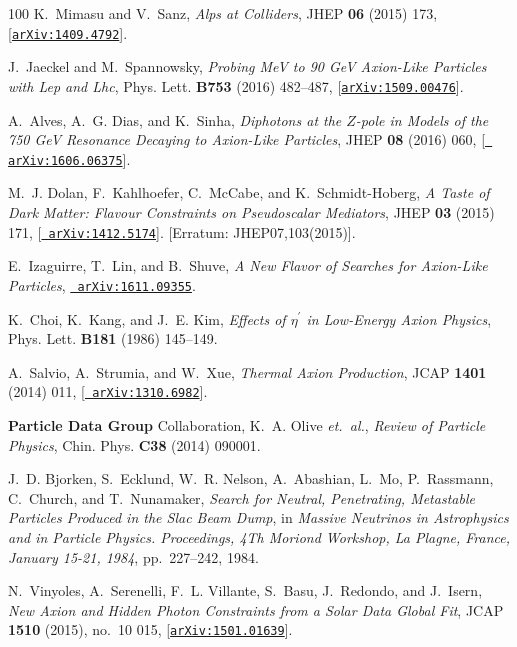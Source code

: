 \documentclass[11pt]{article}
\renewcommand{\[}{\begin{equation}}
\renewcommand{\]}{\end{equation}}
\begin{document}
\begin{thebibliography}{100}
K.~Mimasu and V.~Sanz, {\it {Alps at Colliders}},  JHEP {\bf 06} (2015) 173,
  [\href{http://xxx.lanl.gov/abs/1409.4792}{{\tt arXiv:1409.4792}}].

J.~Jaeckel and M.~Spannowsky, {\it {Probing MeV to 90 GeV Axion-Like Particles
  with Lep and Lhc}},  Phys. Lett. {\bf B753} (2016) 482--487,
  [\href{http://xxx.lanl.gov/abs/1509.00476}{{\tt arXiv:1509.00476}}].

A.~Alves, A.~G. Dias, and K.~Sinha, {\it {Diphotons at the $Z$-pole in Models
  of the 750 GeV Resonance Decaying to Axion-Like Particles}},  JHEP {\bf 08}
  (2016) 060, [\href{http://xxx.lanl.gov/abs/1606.06375}{{\tt
  arXiv:1606.06375}}].

M.~J. Dolan, F.~Kahlhoefer, C.~McCabe, and K.~Schmidt-Hoberg, {\it {A Taste of
  Dark Matter: Flavour Constraints on Pseudoscalar Mediators}},  JHEP {\bf 03}
  (2015) 171, [\href{http://xxx.lanl.gov/abs/1412.5174}{{\tt
  arXiv:1412.5174}}]. [Erratum: JHEP07,103(2015)].

E.~Izaguirre, T.~Lin, and B.~Shuve, {\it {A New Flavor of Searches for
  Axion-Like Particles}},  \href{http://xxx.lanl.gov/abs/1611.09355}{{\tt
  arXiv:1611.09355}}.

K.~Choi, K.~Kang, and J.~E. Kim, {\it {Effects of $\eta^\prime$ in Low-Energy
  Axion Physics}},  Phys. Lett. {\bf B181} (1986) 145--149.

A.~Salvio, A.~Strumia, and W.~Xue, {\it {Thermal Axion Production}},  JCAP {\bf
  1401} (2014) 011, [\href{http://xxx.lanl.gov/abs/1310.6982}{{\tt
  arXiv:1310.6982}}].

{\bf Particle Data Group} Collaboration, K.~A. Olive {\em et.~al.}, {\it
  {Review of Particle Physics}},  Chin. Phys. {\bf C38} (2014) 090001.

J.~D. Bjorken, S.~Ecklund, W.~R. Nelson, A.~Abashian, L.~Mo, P.~Rassmann,
  C.~Church, and T.~Nunamaker, {\it {Search for Neutral, Penetrating,
  Metastable Particles Produced in the Slac Beam Dump}},  in {\em {Massive
  Neutrinos in Astrophysics and in Particle Physics. Proceedings, 4Th Moriond
  Workshop, La Plagne, France, January 15-21, 1984}}, pp.~227--242, 1984.

N.~Vinyoles, A.~Serenelli, F.~L. Villante, S.~Basu, J.~Redondo, and J.~Isern,
  {\it {New Axion and Hidden Photon Constraints from a Solar Data Global Fit}},
   JCAP {\bf 1510} (2015), no.~10 015,
  [\href{http://xxx.lanl.gov/abs/1501.01639}{{\tt arXiv:1501.01639}}].


\end{thebibliography}
\end{document}
